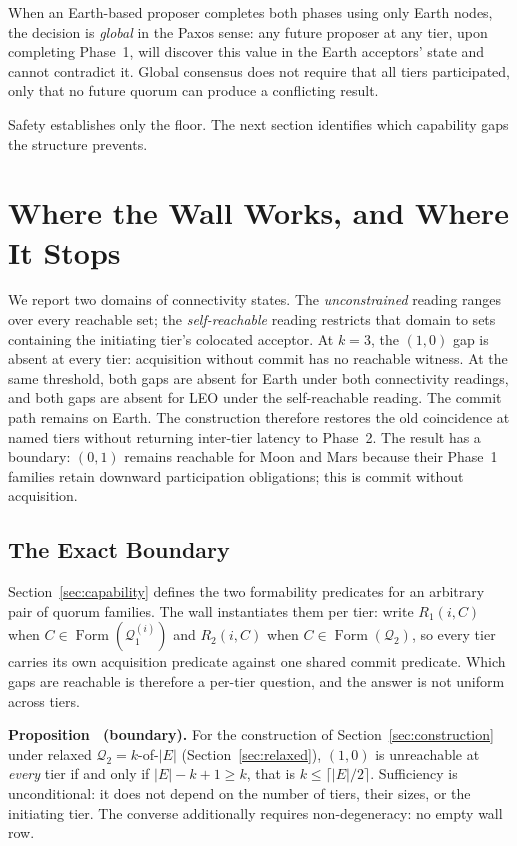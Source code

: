 \documentclass[letterpaper,twocolumn,10pt]{article}
\newcounter{prop}
\begin{document}
When an Earth-based proposer completes both phases using only Earth nodes, the decision is \emph{global} in the Paxos sense: any future proposer at any tier, upon completing Phase~1, will discover this value in the Earth acceptors' state and cannot contradict it. Global consensus does not require that all tiers participated, only that no future quorum can produce a conflicting result.

Safety establishes only the floor. The next section identifies which capability gaps the structure prevents.


\section{Where the Wall Works, and Where It Stops}

We report two domains of connectivity states. The \emph{unconstrained} reading ranges over every reachable set; the \emph{self-reachable} reading restricts that domain to sets containing the initiating tier's colocated acceptor. At $k=3$, the $(1,0)$ gap is absent at every tier: acquisition without commit has no reachable witness. At the same threshold, both gaps are absent for Earth under both connectivity readings, and both gaps are absent for LEO under the self-reachable reading. The commit path remains on Earth. The construction therefore restores the old coincidence at named tiers without returning inter-tier latency to Phase~2. The result has a boundary: $(0,1)$ remains reachable for Moon and Mars because their Phase~1 families retain downward participation obligations; this is commit without acquisition.

\subsection{The Exact Boundary}
\label{sec:capability-wall}

Section~\ref{sec:capability} defines the two formability predicates for an arbitrary pair of quorum families. The wall instantiates them per tier: write $R_1(i,C)$ when $C \in \operatorname{Form}(\mathcal{Q}_1^{(i)})$ and $R_2(i,C)$ when $C \in \operatorname{Form}(\mathcal{Q}_2)$, so every tier carries its own acquisition predicate against one shared commit predicate. Which gaps are reachable is therefore a per-tier question, and the answer is not uniform across tiers.

\label{prop:boundary}\textbf{Proposition \theprop\ (boundary).} For the construction of Section~\ref{sec:construction} under relaxed $\mathcal{Q}_2 = k$-of-$|E|$ (Section~\ref{sec:relaxed}), $(1,0)$ is unreachable at \emph{every} tier if and only if $|E| - k + 1 \ge k$, that is $k \le \lceil |E|/2 \rceil$. Sufficiency is unconditional: it does not depend on the number of tiers, their sizes, or the initiating tier. The converse additionally requires non-degeneracy: no empty wall row.
\end{document}
